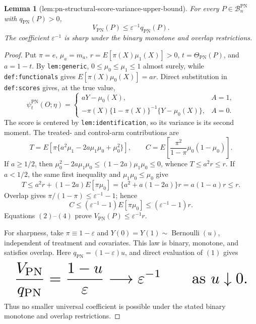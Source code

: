 \documentclass{article}
\newtheorem{lemma}{Lemma}
\begin{document}
\begin{lemma}[lem:pn-structural-score-variance-upper-bound]\label{lem:pn-structural-score-variance-upper-bound}
For every \(P\in\mathcal B_n^{\mathrm{PN}}\) with \(q_{\mathrm{PN}}(P)>0\),
\[V_{\mathrm{PN}}(P)\le\varepsilon^{-1}q_{\mathrm{PN}}(P).\]
The coefficient \(\varepsilon^{-1}\) is sharp under the binary monotone and overlap restrictions.
\end{lemma}
\begin{proof}
Put \(\pi=e\), \(\mu_a=m_a\), \(r=E[\pi(X)\mu_1(X)]>0\), \(t=\Theta_{\mathrm{PN}}(P)\), and \(a=1-t\). By \texttt{lem:generic}, \(0\le\mu_0\le\mu_1\le1\) almost surely, while \texttt{def:functionals} gives \(E[\pi(X)\mu_0(X)]=ar\). Direct substitution in \texttt{def:scores} gives, at the true value,
\[\psi_t^{\mathrm{PN}}(O;\eta)=\begin{cases}aY-\mu_0(X),&A=1,\\-\pi(X)\{1-\pi(X)\}^{-1}\{Y-\mu_0(X)\},&A=0.\end{cases}\tag{1}\]
The score is centered by \texttt{lem:identification}, so its variance is its second moment. The treated- and control-arm contributions are
\[T=E\!\left[\pi\{a^2\mu_1-2a\mu_1\mu_0+\mu_0^2\}\right],\qquad C=E\!\left[\frac{\pi^2}{1-\pi}\mu_0(1-\mu_0)\right].\tag{2}\]
If \(a\ge1/2\), then \(\mu_0^2-2a\mu_1\mu_0\le(1-2a)\mu_1\mu_0\le0\), whence \(T\le a^2r\le r\). If \(a<1/2\), the same first inequality and \(\mu_1\mu_0\le\mu_0\) give
\[T\le a^2r+(1-2a)E[\pi\mu_0]=\{a^2+a(1-2a)\}r=a(1-a)r\le r.\tag{3}\]
Overlap gives \(\pi/(1-\pi)\le\varepsilon^{-1}-1\); hence
\[C\le(\varepsilon^{-1}-1)E[\pi\mu_0]\le(\varepsilon^{-1}-1)r.\tag{4}\]
Equations \((2)\)--\((4)\) prove \(V_{\mathrm{PN}}(P)\le\varepsilon^{-1}r\).

For sharpness, take \(\pi\equiv1-\varepsilon\) and \(Y(0)=Y(1)\sim\operatorname{Bernoulli}(u)\), independent of treatment and covariates. This law is binary, monotone, and satisfies overlap. Here \(q_{\mathrm{PN}}=(1-\varepsilon)u\), and direct evaluation of \((1)\) gives
\[
\makebox[\linewidth][c]{\resizebox{0.98\linewidth}{!}{\par\noindent \makebox[\linewidth][c]{\resizebox{0.98\linewidth}{!}{\(\displaystyle \displaystyle \frac{V_{\mathrm{PN}}}{q_{\mathrm{PN}}}=\frac{1-u}{\varepsilon}\longrightarrow\varepsilon^{-1}\qquad\text{as }u\downarrow0.\)}}\par\noindent}}
\]
Thus no smaller universal coefficient is possible under the stated binary monotone and overlap restrictions.
\end{proof}
\end{document}
